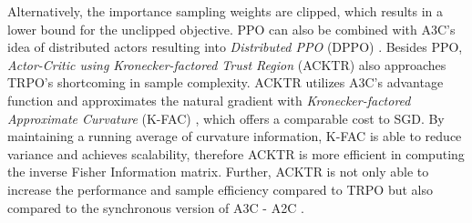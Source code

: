     Alternatively, the importance sampling weights are clipped, which results in a lower bound for the unclipped objective.
    PPO can also be combined with A3C's idea of distributed actors resulting into \textit{Distributed PPO} (DPPO) \cite{Heess2017}. 
    Besides PPO, \textit{Actor-Critic using Kronecker-factored Trust Region} (ACKTR) \cite{Wu2017} also approaches TRPO's shortcoming in sample complexity.
    ACKTR utilizes A3C's advantage function and approximates the natural gradient with \textit{Kronecker-factored Approximate Curvature} (K-FAC) \cite{Grosse2016,Martens2015}, which offers a comparable cost to SGD. 
    By maintaining a running average of curvature information, K-FAC is able to reduce variance and achieves scalability, therefore ACKTR is more efficient in computing the inverse Fisher Information matrix. 
    Further, ACKTR is not only able to increase the performance and sample efficiency compared to TRPO but also compared to the synchronous version of A3C - A2C \cite{Mnih2016}. 
	

